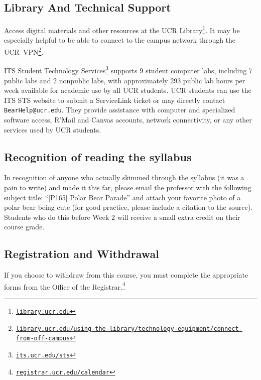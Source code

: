 \documentclass[12pt]{article}
\newcommand{\footlink}[1]{\footnote{\href{https://#1}{\texttt{#1}}}}
\newcommand{\UCR}{\acro{UCR}\xspace}
\newcommand\acro[1]{{\small {#1}}}
\numberwithin{equation}{section}    %
\begin{document}
\subsection{Library And Technical Support}

Access digital materials and other resources at the \UCR Library\footlink{library.ucr.edu}. It may be especially helpful to be able to connect to the campus network through the \UCR~\acro{VPN}\footlink{library.ucr.edu/using-the-library/technology-equipment/connect-from-off-campus}.

\acro{ITS} Student Technology Services\footlink{its.ucr.edu/sts} supports 9 student computer labs, including 7 public labs and 2 nonpublic labs, with approximately 293 public lab hours per week available for academic use by all \UCR students. \UCR students can use the \acro{ITS STS} website to submit a ServiceLink ticket or may directly contact \texttt{BearHelp@ucr.edu}. They provide assistance with computer and specialized software access, R'Mail and Canvas accounts, network connectivity, or any other services used by \UCR students.

\subsection{Recognition of reading the syllabus}

In recognition of anyone who actually skimmed through the syllabus (it was a pain to write) and made it this far, please email the professor with the following subject title: ``[P165] Polar Bear Parade'' and attach your favorite photo of a polar bear being cute (for good practice, please include a citation to the source). Students who do this before Week 2 will receive a small extra credit on their course grade.

\subsection{Registration and Withdrawal}

If you choose to withdraw from this course, you must complete the appropriate forms from the Office of the Registrar.\footlink{registrar.ucr.edu/calendar}
\end{document}
